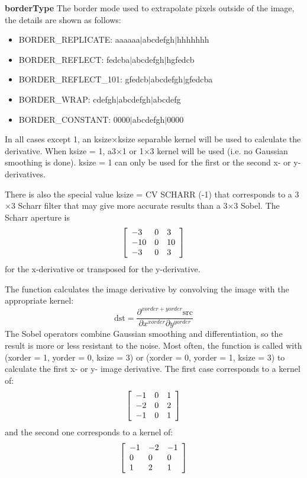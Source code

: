 \documentclass{article}
\begin{document}
\textbf{borderType }The border mode used to extrapolate pixels outside of
the image, the details are shown as follows:

\begin{itemize}
\item BORDER{\_}REPLICATE: aaaaaa$\vert $abcdefgh$\vert $hhhhhhh
\item BORDER{\_}REFLECT: fedcba$\vert $abcdefgh$\vert $hgfedcb
\item BORDER{\_}REFLECT{\_}101: gfedcb$\vert $abcdefgh$\vert $gfedcba
\item BORDER{\_}WRAP: cdefgh$\vert $abcdefgh$\vert $abcdefg
\item BORDER{\_}CONSTANT: 0000$\vert $abcdefgh$\vert $0000
\end{itemize}

In all cases except 1, an ksize$\times $ksize separable kernel will be used
to calculate the derivative. When ksize = 1, a3$\times $1 or 1$\times $3
kernel will be used (i.e. no Gaussian smoothing is done). ksize = 1 can only
be used for the first or the second x- or y- derivatives.

There is also the special value ksize = CV SCHARR (-1) that corresponds to a
3$\times $3 Scharr filter that may give more accurate results than a
3$\times $3 Sobel. The Scharr aperture is
\[
\left[ {{\begin{array}{*{20}c}
 {-3} \hfill & 0 \hfill & 3 \hfill \\
 {-10} \hfill & 0 \hfill & {10} \hfill \\
 {-3} \hfill & 0 \hfill & 3 \hfill \\
\end{array} }} \right]
\]
for the x-derivative or transposed for the y-derivative.

The function calculates the image derivative by convolving the image with
the appropriate kernel:
\[
\mbox{dst}=\frac{\partial ^{xorder+yorder}\mbox{src}}{\partial
x^{xorder}\partial y^{yorder}}
\]
The Sobel operators combine Gaussian smoothing and differentiation, so the
result is more or less resistant to the noise. Most often, the function is
called with (xorder = 1, yorder = 0, ksize = 3) or (xorder = 0, yorder = 1,
ksize = 3) to calculate the first x- or y- image derivative. The first case
corresponds to a kernel of:
\[
\left[ {{\begin{array}{*{20}c}
 {-1} \hfill & 0 \hfill & 1 \hfill \\
 {-2} \hfill & 0 \hfill & 2 \hfill \\
 {-1} \hfill & 0 \hfill & 1 \hfill \\
\end{array} }} \right]
\]
and the second one corresponds to a kernel of:
\[
\left[ {{\begin{array}{*{20}c}
 {-1} \hfill & {-2} \hfill & {-1} \hfill \\
 0 \hfill & 0 \hfill & 0 \hfill \\
 1 \hfill & 2 \hfill & 1 \hfill \\
\end{array} }} \right]
\]
\newpage
\end{document}
